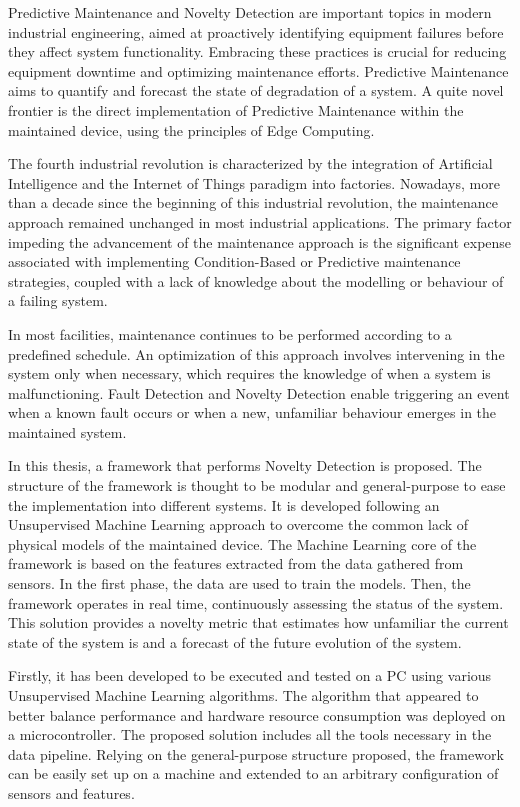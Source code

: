 Predictive Maintenance and Novelty Detection are important topics in modern industrial engineering, aimed at proactively identifying equipment failures before they affect system functionality. Embracing these practices is crucial for reducing equipment downtime and optimizing maintenance efforts. Predictive Maintenance aims to quantify and forecast the state of degradation of a system. A quite novel frontier is the direct implementation of Predictive Maintenance within the maintained device, using the principles of Edge Computing.

The fourth industrial revolution is characterized by the integration of Artificial Intelligence and the Internet of Things paradigm into factories. Nowadays, more than a decade since the beginning of this industrial revolution, the maintenance approach remained unchanged in most industrial applications. The primary factor impeding the advancement of the maintenance approach is the significant expense associated with implementing Condition-Based or Predictive maintenance strategies, coupled with a lack of knowledge about the modelling or behaviour of a failing system.

In most facilities, maintenance continues to be performed according to a predefined schedule. An optimization of this approach involves intervening in the system only when necessary, which requires the knowledge of when a system is malfunctioning. Fault Detection and Novelty Detection enable triggering an event when a known fault occurs or when a new, unfamiliar behaviour emerges in the maintained system. 

In this thesis, a framework that performs Novelty Detection is proposed. The structure of the framework is thought to be modular and general-purpose to ease the implementation into different systems. It is developed following an Unsupervised Machine Learning approach to overcome the common lack of physical models of the maintained device. The Machine Learning core of the framework is based on the features extracted from the data gathered from sensors. In the first phase, the data are used to train the models. Then, the framework operates in real time, continuously assessing the status of the system. This solution provides a novelty metric that estimates how unfamiliar the current state of the system is and a forecast of the future evolution of the system.

Firstly, it has been developed to be executed and tested on a PC using various Unsupervised Machine Learning algorithms. The algorithm that appeared to better balance performance and hardware resource consumption was deployed on a microcontroller. The proposed solution includes all the tools necessary in the data pipeline. Relying on the general-purpose structure proposed, the framework can be easily set up on a machine and extended to an arbitrary configuration of sensors and features. 

